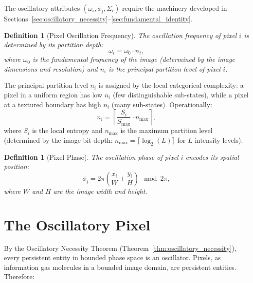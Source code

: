 \documentclass[11pt,twocolumn,a4paper]{article}
\newtheorem{definition}[theorem]{Definition}
\begin{document}
The oscillatory attributes $(\omega_i, \phi_i, \Sigma_i)$ require the machinery developed in Sections~\ref{sec:oscillatory_necessity}--\ref{sec:fundamental_identity}.

\begin{definition}[Pixel Oscillation Frequency]\label{def:pixel_freq}
The oscillation frequency of pixel $i$ is determined by its partition depth:
\begin{equation}
    \omega_i = \omega_0 \cdot n_i,
    \label{eq:pixel_freq}
\end{equation}
where $\omega_0$ is the fundamental frequency of the image (determined by the image dimensions and resolution) and $n_i$ is the principal partition level of pixel $i$.
\end{definition}

The principal partition level $n_i$ is assigned by the local categorical complexity: a pixel in a uniform region has low $n_i$ (few distinguishable sub-states), while a pixel at a textured boundary has high $n_i$ (many sub-states). Operationally:
\begin{equation}
    n_i = \left\lceil \frac{S_i}{S_{\max}} \cdot n_{\max} \right\rceil,
    \label{eq:n_assignment}
\end{equation}
where $S_i$ is the local entropy and $n_{\max}$ is the maximum partition level (determined by the image bit depth: $n_{\max} = \lceil \log_2(L) \rceil$ for $L$ intensity levels).

\begin{definition}[Pixel Phase]\label{def:pixel_phase}
The oscillation phase of pixel $i$ encodes its spatial position:
\begin{equation}
    \phi_i = 2\pi \left( \frac{x_i}{W} + \frac{y_i}{H} \right) \mod 2\pi,
    \label{eq:pixel_phase}
\end{equation}
where $W$ and $H$ are the image width and height.
\end{definition}

\section{The Oscillatory Pixel}\label{sec:oscillatory_pixel}

By the Oscillatory Necessity Theorem (Theorem~\ref{thm:oscillatory_necessity}), every persistent entity in bounded phase space is an oscillator. Pixels, as information gas molecules in a bounded image domain, are persistent entities. Therefore:
\end{document}
